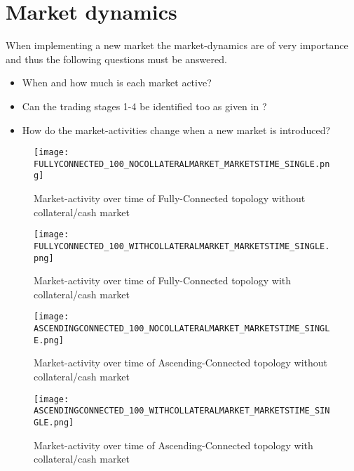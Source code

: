 \documentclass[Bachelorarbeit.tex]{subfiles}
\begin{document}
\section{Market dynamics}
When implementing a new market the market-dynamics are of very importance and thus the following questions must be answered.

\begin{itemize}
\item When and how much is each market active? 
\item Can the trading stages 1-4 be identified too as given in \cite{Breuer_2015}?
\item How do the market-activities change when a new market is introduced?
\end{itemize}

\begin{figure}[H]
	\centering
  \texttt{[image: FULLYCONNECTED\_100\_NOCOLLATERALMARKET\_MARKETSTIME\_SINGLE.png]}
  	\caption{Market-activity over time of Fully-Connected topology without collateral/cash market}
	\label{fig:wealth_FULLYCONNECTED_100_WITHCOLLATERALMARKET_MARKETSTIME_REPL}
\end{figure}

\begin{figure}[H]
	\centering
  \texttt{[image: FULLYCONNECTED\_100\_WITHCOLLATERALMARKET\_MARKETSTIME\_SINGLE.png]}
  	\caption{Market-activity over time of Fully-Connected topology with collateral/cash market}
	\label{fig:wealth_FULLYCONNECTED_100_WITHCOLLATERALMARKET_MARKETSTIME_REPL}
\end{figure}


\begin{figure}[H]
	\centering
  \texttt{[image: ASCENDINGCONNECTED\_100\_NOCOLLATERALMARKET\_MARKETSTIME\_SINGLE.png]}
	\caption{Market-activity over time of Ascending-Connected topology without collateral/cash market}
	\label{fig:wealth_ASCENDINGCONNECTED_100_WITHCOLLATERALMARKET_MARKETSTIME_REPL}
\end{figure}

\begin{figure}[H]
	\centering
  \texttt{[image: ASCENDINGCONNECTED\_100\_WITHCOLLATERALMARKET\_MARKETSTIME\_SINGLE.png]}
	\caption{Market-activity over time of Ascending-Connected topology with collateral/cash market}
	\label{fig:wealth_ASCENDINGCONNECTED_100_WITHCOLLATERALMARKET_MARKETSACCUM_REPL}
\end{figure}
\end{document}
